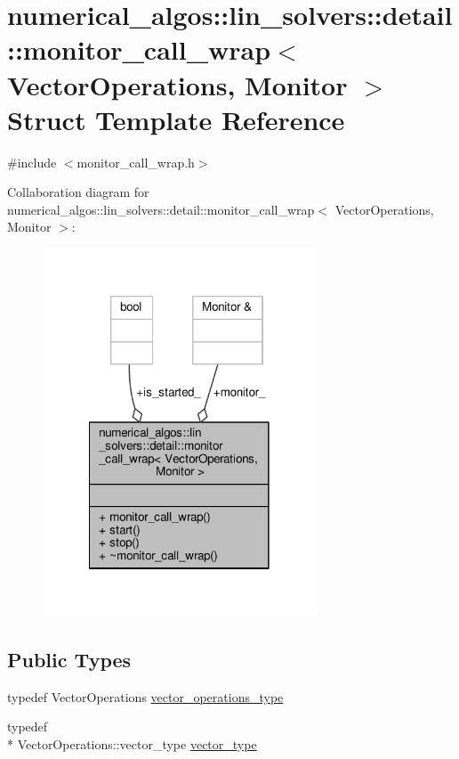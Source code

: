 \hypertarget{structnumerical__algos_1_1lin__solvers_1_1detail_1_1monitor__call__wrap}{\section{numerical\-\_\-algos\-:\-:lin\-\_\-solvers\-:\-:detail\-:\-:monitor\-\_\-call\-\_\-wrap$<$ Vector\-Operations, Monitor $>$ Struct Template Reference}
\label{structnumerical__algos_1_1lin__solvers_1_1detail_1_1monitor__call__wrap}
}


{\ttfamily \#include $<$monitor\-\_\-call\-\_\-wrap.\-h$>$}



Collaboration diagram for numerical\-\_\-algos\-:\-:lin\-\_\-solvers\-:\-:detail\-:\-:monitor\-\_\-call\-\_\-wrap$<$ Vector\-Operations, Monitor $>$\-:
\nopagebreak
\begin{figure}[H]
\begin{center}
\leavevmode
\includegraphics[width=230pt]{structnumerical__algos_1_1lin__solvers_1_1detail_1_1monitor__call__wrap__coll__graph}
\end{center}
\end{figure}
\subsection*{Public Types}
\begin{DoxyCompactItemize}
\item 
typedef Vector\-Operations \hyperlink{structnumerical__algos_1_1lin__solvers_1_1detail_1_1monitor__call__wrap_aa04de6689ce29ef879768e365695a054}{vector\-\_\-operations\-\_\-type}
\item 
typedef \\*
Vector\-Operations\-::vector\-\_\-type \hyperlink{structnumerical__algos_1_1lin__solvers_1_1detail_1_1monitor__call__wrap_a7fc0dd90e41eee6b70e65ac9b4fb5131}{vector\-\_\-type}
\end{DoxyCompactItemize}
